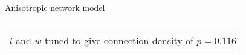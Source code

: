 \begin{frame}{Anisotropic network model}
\begin{columns}
\begin{column}{.5\textwidth}
{\begin{itemize}[leftmargin=0.2cm]
        \end{itemize}

        \vspace{1cm}
            
        \begin{tabular}{|p{}}
          $l$ and $w$ tuned to give connection density of $p=0.116$
        \end{tabular}

        \vspace{1cm}

    }

      
      
    \end{column}
  \end{columns}
  
\end{frame}
